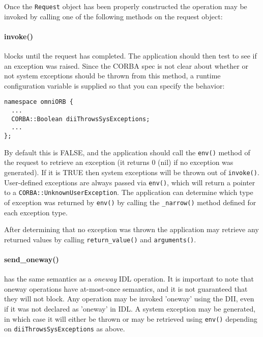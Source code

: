\documentclass[11pt,twoside,onecolumn]{book}
\begin{document}
Once the {\tt Request} object has been properly constructed the operation
may be invoked by calling one of the following methods on the request
object:

\paragraph{invoke()} blocks until the request has completed. The application
should then test to see if an exception was raised. Since the CORBA spec is
not clear about whether or not system exceptions should be thrown from this
method, a runtime configuration variable is supplied so that you can specify
the behavior:
{\small \begin{verbatim}
namespace omniORB {
  ...
  CORBA::Boolean diiThrowsSysExceptions;
  ...
};
\end{verbatim}}
By default this is FALSE, and the application should call the {\tt env()}
method of the request to retrieve an exception (it returns 0 (nil) if no
exception was generated). If it is TRUE then system exceptions will be thrown
out of {\tt invoke()}. User-defined exceptions are always passed via
{\tt env()}, which will return a pointer to a
{\tt CORBA::UnknownUserException}.
The application can determine which type of exception was returned by
{\tt env()}
by calling the {\tt \_narrow()} method defined for each exception type.

After determining that no exception was thrown the application may retrieve
any returned values by calling {\tt return\_value()} and {\tt arguments()}.

\paragraph{send\_oneway()} has the same semantics as a \emph{oneway}
IDL operation. It is important to note that oneway operations have
at-most-once semantics, and it is not guaranteed that they will not
block. Any operation may be invoked 'oneway' using the DII,
even if it was not declared as 'oneway' in IDL. A system exception may be
generated, in which case it will either be thrown or may be retrieved
using {\tt env()} depending on {\tt diiThrowsSysExceptions} as above.
\end{document}
